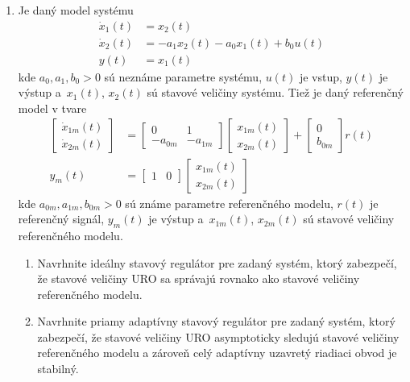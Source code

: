 \documentclass[a4paper, 10pt, ]{article}
\begin{document}
\begin{enumerate}[leftmargin=0pt, labelsep=4mm, itemsep=0pt]
		\item Je daný model systému
		\begin{align*}
			\dot{x}_1(t) &= x_2(t) \\
			\dot{x}_2(t) &= -a_1 x_2(t) - a_0 x_1(t) + b_0 u(t) \\
			y(t) & = x_1(t)
		\end{align*}
		kde $a_0, a_1, b_0 > 0$ sú neznáme parametre systému, $u(t)$ je vstup, $y(t)$ je výstup a~$x_1(t)$, $x_2(t)$ sú stavové veličiny systému. Tiež je daný referenčný model v tvare
		\begin{align*}
			\begin{bmatrix}
				\dot{x}_{1m}(t) \\ \dot{x}_{2m}(t)
			\end{bmatrix}
			&=
			\begin{bmatrix}
				 0 & 1 \\ -a_{0m} & -a_{1m}
			\end{bmatrix}
			\begin{bmatrix}
				 x_{1m}(t)  \\ x_{2m}(t)
			\end{bmatrix}
			+
			\begin{bmatrix}
				 0  \\  b_{0m}
			\end{bmatrix}
			r(t) \\
			y_m(t)
			&=
			\begin{bmatrix}
				 1 & 0
			\end{bmatrix}
			\begin{bmatrix}
				 x_{1m}(t)  \\ x_{2m}(t)
			\end{bmatrix}
		\end{align*}
		kde $a_{0m}, a_{1m}, b_{0m} > 0$ sú známe parametre referenčného modelu, $r(t)$ je referenčný signál, $y_m(t)$ je výstup a~$x_{1m}(t)$, $x_{2m}(t)$ sú stavové veličiny referenčného modelu.


    \begin{enumerate}
    	\item Navrhnite ideálny stavový regulátor pre zadaný systém, ktorý zabezpečí, že stavové veličiny URO sa správajú rovnako ako stavové veličiny referenčného modelu.
    	\item Navrhnite priamy adaptívny stavový regulátor pre zadaný systém, ktorý zabezpečí, že stavové veličiny URO asymptoticky sledujú stavové veličiny referenčného modelu a zároveň celý adaptívny uzavretý riadiaci obvod je stabilný.
    \end{enumerate}







\end{enumerate}
\end{document}
